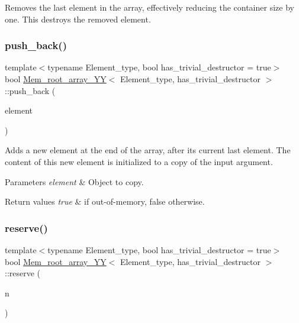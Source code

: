 Removes the last element in the array, effectively reducing the container size by one. This destroys the removed element. \mbox{\label{classMem__root__array__YY_ad179b3f709bb4b31d3fce461e93be3cf}} 
\subsubsection{\texorpdfstring{push\+\_\+back()}{push\_back()}}
{\footnotesize\ttfamily template$<$typename Element\+\_\+type, bool has\+\_\+trivial\+\_\+destructor = true$>$ \\
bool \mbox{\hyperlink{classMem__root__array__YY}{Mem\+\_\+root\+\_\+array\+\_\+\+YY}}$<$ Element\+\_\+type, has\+\_\+trivial\+\_\+destructor $>$\+::push\+\_\+back (\begin{DoxyParamCaption}\item[{const Element\+\_\+type \&}]{element }\end{DoxyParamCaption})\hspace{0.3cm}{\ttfamily [inline]}}

Adds a new element at the end of the array, after its current last element. The content of this new element is initialized to a copy of the input argument.


\begin{DoxyParams}{Parameters}
{\em element} & Object to copy. \\
\hline
\end{DoxyParams}

\begin{DoxyRetVals}{Return values}
{\em true} & if out-\/of-\/memory, false otherwise. \\
\hline
\end{DoxyRetVals}
\mbox{\label{classMem__root__array__YY_ac1538b675c5ef3b9cbe67940b054cc2f}} 
\subsubsection{\texorpdfstring{reserve()}{reserve()}}
{\footnotesize\ttfamily template$<$typename Element\+\_\+type, bool has\+\_\+trivial\+\_\+destructor = true$>$ \\
bool \mbox{\hyperlink{classMem__root__array__YY}{Mem\+\_\+root\+\_\+array\+\_\+\+YY}}$<$ Element\+\_\+type, has\+\_\+trivial\+\_\+destructor $>$\+::reserve (\begin{DoxyParamCaption}\item[{size\+\_\+t}]{n }\end{DoxyParamCaption})\hspace{0.3cm}{\ttfamily [inline]}}

